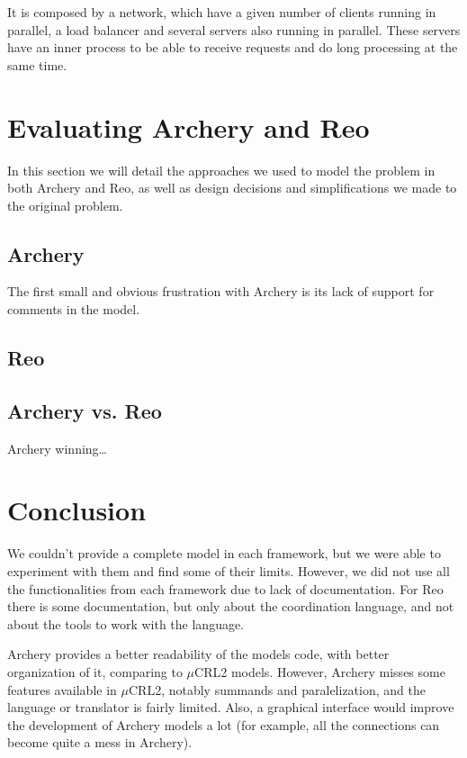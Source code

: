 \documentclass[a4paper]{article}
\newcommand{\ar}{Archery\xspace}
\newcommand{\re}{Reo\xspace}
\newcommand{\mcrl}{$\mu$CRL2\xspace}
\begin{document}
It is composed by a network, which have a given number of clients running in
parallel, a load balancer and several servers also running in parallel. These
servers have an inner process to be able to receive requests and do long
processing at the same time.


%
%
\section{Evaluating \ar and \re}

In this section we will detail the approaches we used to model the problem in
both \ar and \re, as well as design decisions and simplifications we made to the
original problem.



\subsection{\ar}

The first small and obvious frustration with \ar is its lack of support for
comments in the model.

\subsection{\re}


\subsection{\ar vs. \re}

\ar winning\dots

%
%
\section{Conclusion}
We couldn't provide a complete model in each framework, but we were able to
experiment with them and find some of their limits. However, we did not use all the
functionalities from each framework due to lack of documentation. For \re there
is some documentation, but only about the coordination language, and not about
the tools to work with the language.

\ar provides a better readability of the models code, with better organization
of it, comparing to \mcrl models. However, \ar misses some features available
in \mcrl, notably summands and paralelization, and the language or translator is
fairly limited. Also, a graphical interface would improve the development of
\ar models a lot (for example, all the connections can become quite a mess in
\ar).
\end{document}

